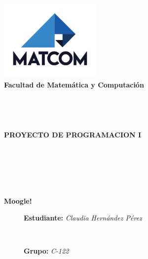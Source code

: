 \documentclass[letterpaper]{article}
\begin{document}
\begin{flushright}
	\includegraphics[width=5cm, height=4cm]{logoMATCOM.png}\\
	{\scriptsize \textbf{Facultad de Matemática y Computación}}
\end{flushright}

\

\

\begin{center}
	\textbf{{\Huge PROYECTO DE PROGRAMACION I}}

	\

	\

	\

	\textbf{{\Huge Moogle!}}
\end{center}
\begin{figure}[b]
	\begin{flushleft}
		{\huge \textbf{Estudiante:} \textit{Claudia Hernández Pérez}}

		\
	
		{\LARGE \textbf{Grupo:} \textit{C-122}}
	\end{flushleft}
\end{figure}
\end{document}
